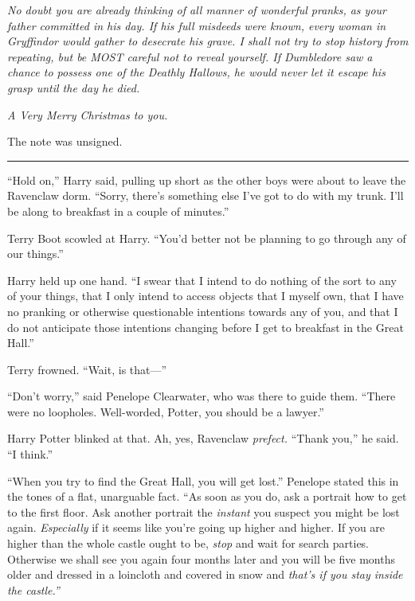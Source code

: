 \emph{No doubt you are already thinking of all manner of wonderful
pranks, as your father committed in his day. If his full misdeeds were
known, every woman in Gryffindor would gather to desecrate his grave. I
shall not try to stop history from repeating, but be MOST careful not to
reveal yourself. If Dumbledore saw a chance to possess one of the
Deathly Hallows, he would never let it escape his grasp until the day he
died.}

\emph{A Very Merry Christmas to you.}

The note was unsigned.

\begin{center}\rule{3in}{0.4pt}\end{center}

``Hold on,'' Harry said, pulling up short as the other boys were about
to leave the Ravenclaw dorm. ``Sorry, there's something else I've got to
do with my trunk. I'll be along to breakfast in a couple of minutes.''

Terry Boot scowled at Harry. ``You'd better not be planning to go
through any of our things.''

Harry held up one hand. ``I swear that I intend to do nothing of the
sort to any of your things, that I only intend to access objects that I
myself own, that I have no pranking or otherwise questionable intentions
towards any of you, and that I do not anticipate those intentions
changing before I get to breakfast in the Great Hall.''

Terry frowned. ``Wait, is that---''

``Don't worry,'' said Penelope Clearwater, who was there to guide them.
``There were no loopholes. Well-worded, Potter, you should be a
lawyer.''

Harry Potter blinked at that. Ah, yes, Ravenclaw \emph{prefect.} ``Thank
you,'' he said. ``I think.''

``When you try to find the Great Hall, you will get lost.'' Penelope
stated this in the tones of a flat, unarguable fact. ``As soon as you
do, ask a portrait how to get to the first floor. Ask another portrait
the \emph{instant} you suspect you might be lost again.
\emph{Especially} if it seems like you're going up higher and higher. If
you are higher than the whole castle ought to be, \emph{stop} and wait
for search parties. Otherwise we shall see you again four months later
and you will be five months older and dressed in a loincloth and covered
in snow and \emph{that's if you stay inside the castle.''}

